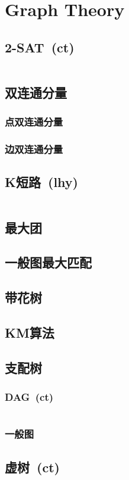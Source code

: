 \chapter{Graph Theory}
\section{2-SAT\ \small(ct)}
	\inputminted{cpp}{GraphTheory/2_sat.cpp}
\section{双连通分量}
	\subsection{点双连通分量}
	\subsection{边双连通分量}
\section{K短路\ \small(lhy)}
	\inputminted{cpp}{GraphTheory/kth_minimum_path.cpp}
\section{最大团}
\section{一般图最大匹配}
\section{带花树}
\section{KM算法}
\section{支配树}
	\subsection{DAG\ \small(ct)}
		\inputminted{cpp}{GraphTheory/dominate_tree_dag.cpp}
	\subsection{一般图}
\section{虚树\ \small(ct)}
	\inputminted{cpp}{GraphTheory/virtual_tree.cpp}
